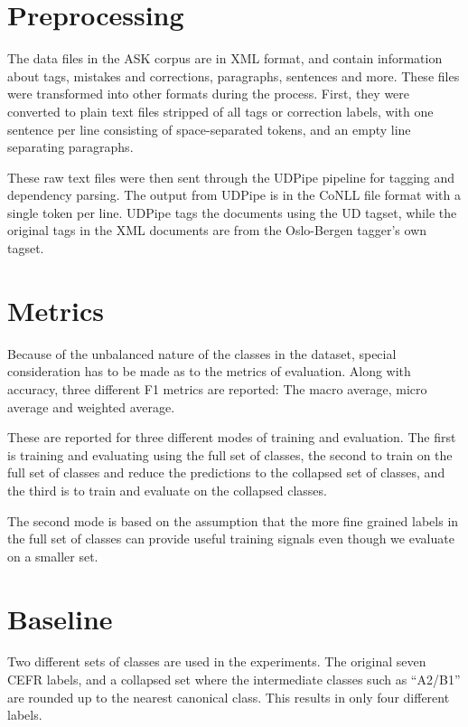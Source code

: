 
\section{Preprocessing}

The data files in the ASK corpus are in XML format, and contain information
about tags, mistakes and corrections, paragraphs, sentences and more. These
files were transformed into other formats during the process. First, they
were converted to plain text files stripped of all tags or correction labels,
with one sentence per line consisting of space-separated tokens, and an empty
line separating paragraphs.

These raw text files were then sent through the UDPipe pipeline for tagging
and dependency parsing. The output from UDPipe is in the CoNLL file format
with a single token per line. UDPipe tags the documents using the UD tagset,
while the original tags in the XML documents are from the Oslo-Bergen
tagger's own tagset.

\section{Metrics}

Because of the unbalanced nature of the classes in the dataset, special
consideration has to be made as to the metrics of evaluation. Along with
accuracy, three different F1 metrics are reported: The macro average, micro
average and weighted average.

These are reported for three different modes of training and evaluation. The
first is training and evaluating using the full set of classes, the second to
train on the full set of classes and reduce the predictions to the collapsed
set of classes, and the third is to train and evaluate on the collapsed
classes.

The second mode is based on the assumption that the more fine grained labels
in the full set of classes can provide useful training signals even though we
evaluate on a smaller set.

\section{Baseline}

Two different sets of classes are used in the experiments. The original seven
CEFR labels, and a collapsed set where the intermediate classes such as
``A2/B1'' are rounded up to the nearest canonical class. This results in only
four different labels.

